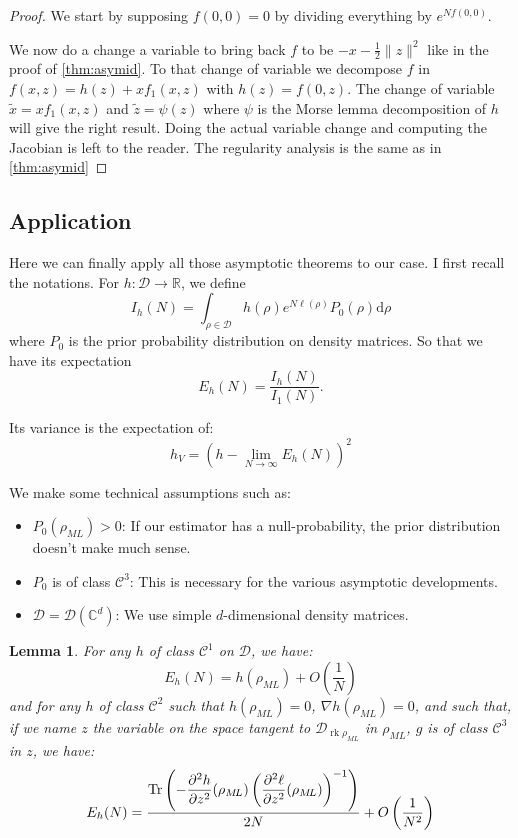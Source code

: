\documentclass[10pt,a4paper]{report}
\theoremstyle{plain}
\newtheorem{lem}[thm]{Lemma}
\theoremstyle{definition}
\theoremstyle{remark}
\newcommand{\R}{\ensuremath{\mathbb{R}}}
\newcommand{\C}{\ensuremath{\mathbb{C}}}
\newcommand{\dd}{\mathrm{d}}
\newcommand{\dparn}[3]{\frac{\partial^{#3} {#1}}{\partial{#2}^{#3}}}
\DeclareMathOperator{\Tr}{Tr}
\DeclareMathOperator{\rk}{rk}
\newcommand{\class}[1]{{\mathscr{C}^{#1}}}
\newcommand{\ml}{_{M\!L}}
\begin{document}
\begin{proof}
  We start by supposing $f(0,0) = 0$ by dividing everything by $e^{Nf(0,0)}$.

  We now do a change a variable to bring back $f$ to be $-x -\frac12\|z\|^2$ like in
  the proof of \cref{thm:asymid}.
  To that change of variable we decompose $f$ in $f(x,z) = h(z) + xf_1(x,z)$
  with $h(z) = f(0,z)$. The change of variable $\tilde x = xf_1(x,z)$ and
  $\tilde z = \psi(z)$ where $\psi$ is the Morse lemma decomposition of $h$ will
  give the right result. Doing the actual variable change and computing the
  Jacobian is left to the reader.
  The regularity analysis is the same as in \cref{thm:asymid}
\end{proof}



\subsection{Application}

Here we can finally apply all those asymptotic theorems to our case. I first recall the
notations. For $h : \mathcal{D} \to \R$, we define
\begin{equation}
I_h(N) = \int_{\rho\in\mathcal{D}} h(\rho) e^{N\ell(\rho)} P_0(\rho) \dd \rho
\end{equation}
where $P_0$ is the prior probability distribution on density matrices.
So that we have its expectation
\begin{equation}
E_h(N) = \frac{I_h(N)}{I_1(N)}.
\end{equation}

Its variance is the expectation of:
\begin{equation}
h_V = {\left(h - \lim_{N \to \infty} E_h(N)\right)}^2
\end{equation}

We make some technical assumptions such as:
\begin{itemize}
\item $P_0(\rho\ml) > 0$: If our estimator has a null-probability, the prior
  distribution doesn't make much sense.
\item $P_0$ is of class $\class 3$: This is necessary for the various asymptotic developments.
\item $\mathcal{D} = \mathcal{D}(\C^d)$: We use simple $d$-dimensional density matrices.
\end{itemize}


\begin{lem}\label{lem:asymain}
  For any $h$ of class $\class 1$ on $\mathcal{D}$, we have:
  \[E_h(N) = h(\rho\ml) + O\left(\frac 1N\right)\]
  and for any $h$  of class $\class 2$ such that $h(\rho\ml) = 0$, $\nabla
  h(\rho\ml) = 0$, and such that,
  if we name $z$ the variable on the space tangent to $\mathcal{D}_{\rk
    \rho\ml}$ in $\rho\ml$, $g$ is of class $\class 3$ in $z$, we have:
  \[E_h(N) = \frac{\displaystyle \Tr \left( - \dparn h z 2 (\rho\ml)  \left( \dparn \ell z
        2(\rho\ml)\right)\inv\right)}{2N} + O\left(\frac 1 {N^2}\right)\]
\end{lem}
\end{document}
